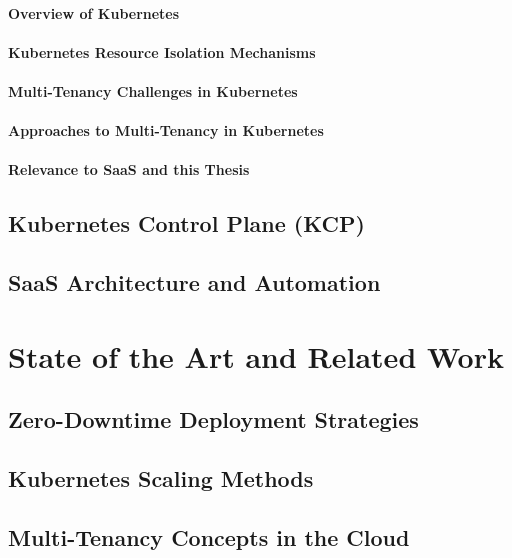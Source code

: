\documentclass[11pt, a4paper, oneside, draft]{scrartcl}
\begin{document}
            \paragraph{Overview of Kubernetes}

            \paragraph{Kubernetes Resource Isolation Mechanisms}

            \paragraph{Multi-Tenancy Challenges in Kubernetes}

            \paragraph{Approaches to Multi-Tenancy in Kubernetes}

            \paragraph{Relevance to SaaS and this Thesis}

        \subsection{Kubernetes Control Plane (KCP)}

        \subsection{SaaS Architecture and Automation}

    \section{State of the Art and Related Work}

        \subsection{Zero-Downtime Deployment Strategies}

        \subsection{Kubernetes Scaling Methods}

        \subsection{Multi-Tenancy Concepts in the Cloud}
\end{document}

